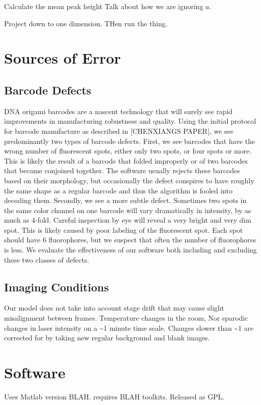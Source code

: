 Calculate the mean peak height
Talk about how we are ignoring $a$.

Project  down to one dimension.  THen run the thing.

\section{Sources of Error}



\subsection{Barcode Defects}
DNA origami barcodes are a nascent technology that will surely see rapid improvements in manufacturing robustness and quality. Using the initial protocol for barcode manufacture as described in [CHENXIANGS PAPER], we see predominantly two types of barcode defects. First, we see barcodes that have the wrong number of fluorescent spots, either only two spots, or four spots or more. This is likely the result of a barcode that folded improperly or of two barcodes that became conjoined together. The software usually rejects these barcodes based on their morphology, but occasionally the defect conspires to have roughly the same shape as a regular barcode and thus the algorithm is fooled into decoding them. Secondly, we see a more subtle defect. Sometimes two spots in the same color channel on one barcode will vary dramatically in intensity, by as much as 4-fold. Careful inspection by eye will reveal a very bright and very dim spot. This is likely caused by poor labeling of the fluorescent spot. Each spot should have 6 fluorophores, but we suspect that often the number of fluorophores is less. We evaluate the effectiveness of our software both including and excluding these two classes of defects.    


\subsection{Imaging Conditions}
Our model does not take into account stage drift that may cause slight misalignment between frames. 
Temperature changes in the room, Nor sparodic changes in laser intensity on a \textasciitilde1 minute time scale. Changes slower than \textasciitilde1 are corrected for by taking new regular background and blank images.
 
\section{Software}
Uses Matlab version BLAH. requires BLAH toolkits. Released as GPL. 
